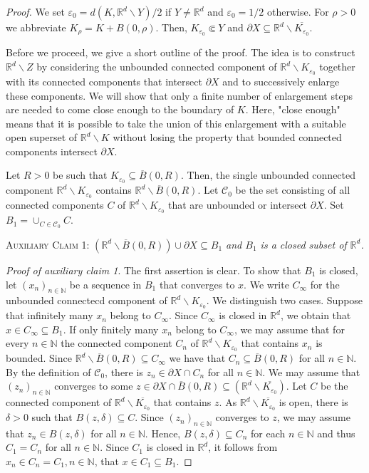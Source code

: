 \documentclass[12pt]{amsart}
\newcommand{\N}{\mathbb{N}}
\newcommand{\R}{\mathbb{R}}
\theoremstyle{definition}
\theoremstyle{remark}
\numberwithin{equation}{section}
\begin{document}
\begin{proof}
	We set $\varepsilon_0= d(K,\R^d\backslash Y)/2$ if $Y\neq\R^d$ and $\varepsilon_0=1/2$ otherwise. For $\rho>0$ we abbreviate $K_\rho= K + B(0,\rho)$. Then, $K_{\varepsilon_0} \Subset Y$ and $\partial X\subseteq\R^d\backslash \overline{K_{\varepsilon_0}}$.

Before we proceed, we give a short outline of the proof. The idea is to construct $\R^d\backslash Z$ by considering the unbounded connected component of $\R^d\backslash K_{\varepsilon_0}$ together with  its connected components that intersect $\partial X$ and to successively enlarge these components. We will show that only a finite number of enlargement steps are needed to come close enough to the boundary of $K$. Here, "close enough" means that it is possible to take the union of this enlargement with a suitable open superset of $\R^d\backslash K$ without losing the property that bounded connected components intersect $\partial X$. 	
	
	
	Let $R>0$ be such that $K_{\varepsilon_0}\subseteq \overline{B}(0,R)$. Then, the single unbounded connected component  $\R^d\backslash K_{\varepsilon_0}$ contains $\R^d\backslash \overline{B}(0,R)$. Let $\mathscr{C}_0$ be the set consisting of all connected components $C$ of $\R^d\backslash K_{\varepsilon_0}$ that are unbounded or intersect $\partial X$. Set $B_1=\cup_{C\in\mathscr{C}_0}C$.
	
	\textsc{Auxiliary Claim 1:}  \emph{$(\R^d\backslash  \overline{B}(0,R)) \cup \partial X \subseteq B_1$ and $B_1$ is a closed subset of $\R^d$.}
	
	\emph{Proof of auxiliary claim 1}. The first assertion is clear. To show that $B_1$ is closed, let $(x_n)_{n\in\N}$ be a sequence in $B_1$ that converges to $x$. We write $C_\infty$ for the unbounded connectecd component of $\R^d\backslash K_{\varepsilon_0}$. We distinguish two cases. Suppose that infinitely many $x_n$ belong to $C_\infty$. Since $C_\infty$ is closed in $\R^d$, we obtain that $x \in C_\infty \subseteq B_1$.  If only finitely many $x_n$ belong to $C_\infty$, we may assume that for every $n\in\N$ the connected component $C_n$ of $\R^d\backslash K_{\varepsilon_0}$ that contains $x_n$ is bounded. Since $\R^d\backslash  \overline{B}(0,R) \subseteq C_\infty$ we have that $C_n\subseteq  \overline{B}(0,R)$ for all $n\in\N$. By the definition of $\mathscr{C}_0$, there is $z_n\in\partial X\cap C_n$ for all $n\in\N$. We may assume that $(z_n)_{n\in\N}$ converges to some 
	$z\in\partial X\cap  \overline{B}(0,R)\subseteq \left(\R^d\backslash \overline{K_{\varepsilon_0}}\right)$.  Let $C$ be the connected component of $\R^d\backslash \overline{K_{\varepsilon_0}}$ that contains $z$. As $\R^d\backslash \overline{K_{\varepsilon_0}}$ is open, there is $\delta>0$ such that $B(z,\delta)\subseteq C$. Since $(z_n)_{n\in\N}$ converges to $z$, we may assume that $z_n\in B(z,\delta)$ for all $n \in \N$. Hence,  $B(z,\delta)\subseteq C_n$ for each $n\in\N$ and thus  $C_1=C_n$ for all $n\in\N$. Since $C_1$ is closed in $\R^d$, it follows from $x_n\in C_n=C_1, n\in\N$, that $x\in C_1 \subseteq B_1$. 
	

\end{proof}
\end{document}
